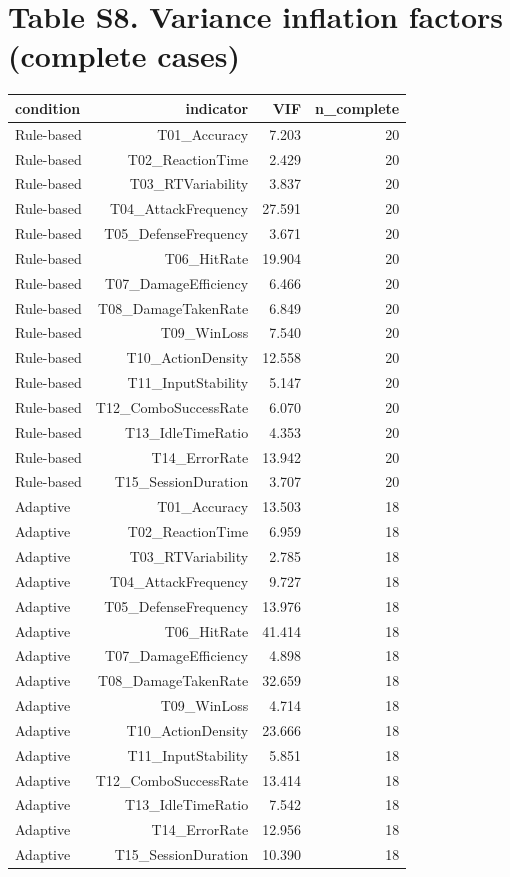\documentclass[10pt]{article}
\begin{document}
\section*{Table S8. Variance inflation factors (complete cases)}
{\scriptsize\setlength{\tabcolsep}{3pt}\begin{longtable}{lrrr}
\toprule
condition & indicator & VIF & n\_complete \\
\midrule
\endhead
Rule-based & T01\_Accuracy & 7.203 & 20 \\
Rule-based & T02\_ReactionTime & 2.429 & 20 \\
Rule-based & T03\_RTVariability & 3.837 & 20 \\
Rule-based & T04\_AttackFrequency & 27.591 & 20 \\
Rule-based & T05\_DefenseFrequency & 3.671 & 20 \\
Rule-based & T06\_HitRate & 19.904 & 20 \\
Rule-based & T07\_DamageEfficiency & 6.466 & 20 \\
Rule-based & T08\_DamageTakenRate & 6.849 & 20 \\
Rule-based & T09\_WinLoss & 7.540 & 20 \\
Rule-based & T10\_ActionDensity & 12.558 & 20 \\
Rule-based & T11\_InputStability & 5.147 & 20 \\
Rule-based & T12\_ComboSuccessRate & 6.070 & 20 \\
Rule-based & T13\_IdleTimeRatio & 4.353 & 20 \\
Rule-based & T14\_ErrorRate & 13.942 & 20 \\
Rule-based & T15\_SessionDuration & 3.707 & 20 \\
Adaptive & T01\_Accuracy & 13.503 & 18 \\
Adaptive & T02\_ReactionTime & 6.959 & 18 \\
Adaptive & T03\_RTVariability & 2.785 & 18 \\
Adaptive & T04\_AttackFrequency & 9.727 & 18 \\
Adaptive & T05\_DefenseFrequency & 13.976 & 18 \\
Adaptive & T06\_HitRate & 41.414 & 18 \\
Adaptive & T07\_DamageEfficiency & 4.898 & 18 \\
Adaptive & T08\_DamageTakenRate & 32.659 & 18 \\
Adaptive & T09\_WinLoss & 4.714 & 18 \\
Adaptive & T10\_ActionDensity & 23.666 & 18 \\
Adaptive & T11\_InputStability & 5.851 & 18 \\
Adaptive & T12\_ComboSuccessRate & 13.414 & 18 \\
Adaptive & T13\_IdleTimeRatio & 7.542 & 18 \\
Adaptive & T14\_ErrorRate & 12.956 & 18 \\
Adaptive & T15\_SessionDuration & 10.390 & 18 \\
\bottomrule
\end{longtable}}
\end{document}
